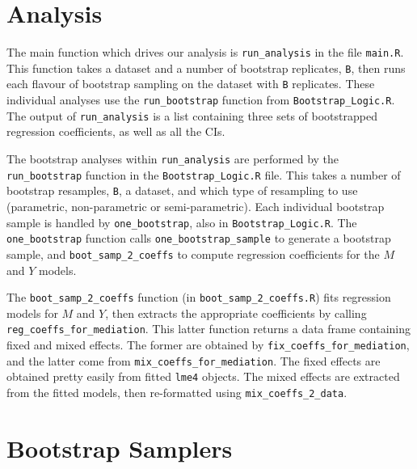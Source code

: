 \documentclass{article}
\begin{document}
\section{Analysis}

The main function which drives our analysis is \texttt{run\_analysis} in the file \texttt{main.R}. This function takes a dataset and a number of bootstrap replicates, \texttt{B}, then runs each flavour of bootstrap sampling on the dataset with \texttt{B} replicates. These individual analyses use the \texttt{run\_bootstrap} function from \texttt{Bootstrap\_Logic.R}. The output of \texttt{run\_analysis} is a list containing three sets of bootstrapped regression coefficients, as well as all the CIs. 

The bootstrap analyses within \texttt{run\_analysis} are performed by the \texttt{run\_bootstrap} function in the \texttt{Bootstrap\_Logic.R} file. This takes a number of bootstrap resamples, \texttt{B}, a dataset, and which type of resampling to use (parametric, non-parametric or semi-parametric). Each individual bootstrap sample is handled by \texttt{one\_bootstrap}, also in \texttt{Bootstrap\_Logic.R}. The \texttt{one\_bootstrap} function calls \texttt{one\_bootstrap\_sample} to generate a bootstrap sample, and \texttt{boot\_samp\_2\_coeffs} to compute regression coefficients for the $M$ and $Y$ models.

The \texttt{boot\_samp\_2\_coeffs} function (in \texttt{boot\_samp\_2\_coeffs.R}) fits regression models for $M$ and $Y$, then extracts the appropriate coefficients by calling \texttt{reg\_coeffs\_for\_mediation}. This latter function returns a data frame containing fixed and mixed effects. The former are obtained by \texttt{fix\_coeffs\_for\_mediation}, and the latter come from \texttt{mix\_coeffs\_for\_mediation}. The fixed effects are obtained pretty easily from fitted \texttt{lme4} objects. The mixed effects are extracted from the fitted models, then re-formatted using \texttt{mix\_coeffs\_2\_data}.

\section{Bootstrap Samplers}
\end{document}
